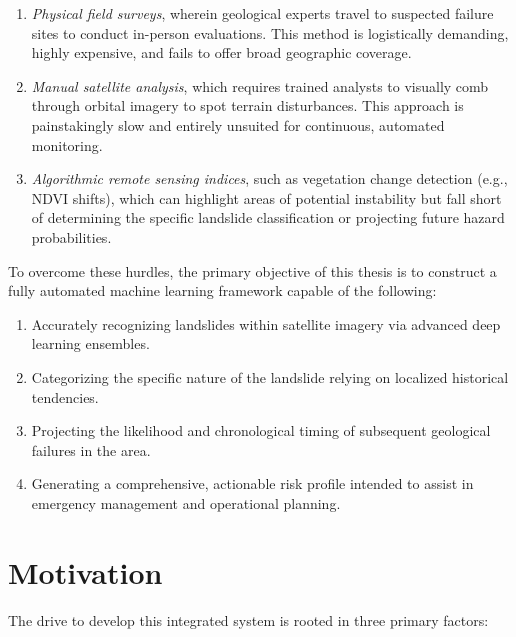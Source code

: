 \documentclass[12pt,a4paper]{report}
\begin{document}
\begin{enumerate}
    \item \textit{Physical field surveys}, wherein geological experts travel to suspected failure sites to conduct in-person evaluations. This method is logistically demanding, highly expensive, and fails to offer broad geographic coverage.
    \item \textit{Manual satellite analysis}, which requires trained analysts to visually comb through orbital imagery to spot terrain disturbances. This approach is painstakingly slow and entirely unsuited for continuous, automated monitoring.
    \item \textit{Algorithmic remote sensing indices}, such as vegetation change detection (e.g., NDVI shifts), which can highlight areas of potential instability but fall short of determining the specific landslide classification or projecting future hazard probabilities.
\end{enumerate}

To overcome these hurdles, the primary objective of this thesis is to construct a fully automated machine learning framework capable of the following:

\begin{enumerate}
    \item Accurately recognizing landslides within satellite imagery via advanced deep learning ensembles.
    \item Categorizing the specific nature of the landslide relying on localized historical tendencies.
    \item Projecting the likelihood and chronological timing of subsequent geological failures in the area.
    \item Generating a comprehensive, actionable risk profile intended to assist in emergency management and operational planning.
\end{enumerate}

\section{Motivation}
The drive to develop this integrated system is rooted in three primary factors:
\end{document}
